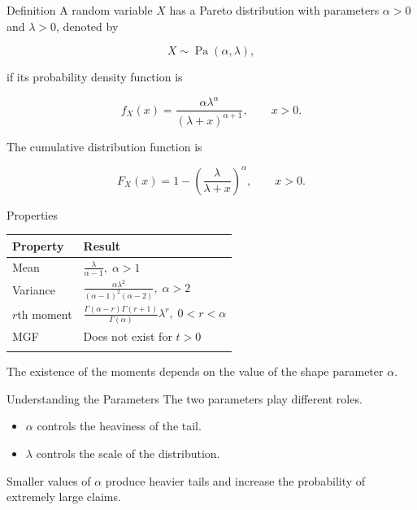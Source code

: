 \documentclass[
  ignorenonframetext,
  aspectratio=169,
]{beamer}
\newcounter{none} %
\providecommand{\tightlist}{%
  \setlength{\itemsep}{0pt}\setlength{\parskip}{0pt}}
\begin{document}
\begin{frame}{Definition}
\protect{}\label{definition-2}
A random variable \(X\) has a Pareto distribution with parameters
\(\alpha>0\) and \(\lambda>0\), denoted by

\[
X\sim\operatorname{Pa}(\alpha,\lambda),
\]

if its probability density function is

\[
f_X(x)
=
\frac{\alpha\lambda^\alpha}
{(\lambda+x)^{\alpha+1}},
\qquad x>0.
\]

The cumulative distribution function is

\[
F_X(x)
=
1-
\left(
\frac{\lambda}{\lambda+x}
\right)^\alpha,
\qquad x>0.
\]
\end{frame}

\begin{frame}{Properties}
\protect{}\label{properties-2}
{\def\LTcaptype{none} %
\begin{longtable}[]{@{}
  >{\raggedright\arraybackslash}p{}
  >{\raggedright\arraybackslash}p{}@{}}
\toprule\noalign{}
\begin{minipage}[b]{\linewidth}\raggedright
Property
\end{minipage} & \begin{minipage}[b]{\linewidth}\raggedright
Result
\end{minipage} \\
\midrule\noalign{}
\endhead
Mean & \(\displaystyle \frac{\lambda}{\alpha-1},\;\alpha>1\) \\
Variance &
\(\displaystyle \frac{\alpha\lambda^2}{(\alpha-1)^2(\alpha-2)},\;\alpha>2\) \\
\(r\)th moment &
\(\displaystyle \frac{\Gamma(\alpha-r)\Gamma(r+1)}{\Gamma(\alpha)}\lambda^r,\;0<r<\alpha\) \\
MGF & Does not exist for \(t>0\) \\
\bottomrule\noalign{}
\end{longtable}
}

The existence of the moments depends on the value of the shape parameter
\(\alpha\).
\end{frame}

\begin{frame}{Understanding the Parameters}
\protect{}\label{understanding-the-parameters-1}
The two parameters play different roles.

\begin{itemize}
\tightlist
\item
  \(\alpha\) controls the heaviness of the tail.
\item
  \(\lambda\) controls the scale of the distribution.
\end{itemize}

Smaller values of \(\alpha\) produce heavier tails and increase the
probability of extremely large claims.
\end{frame}
\end{document}
